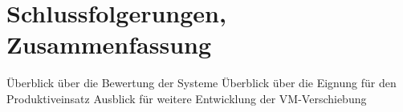 \section{Schlussfolgerungen, Zusammenfassung}
Überblick über die Bewertung der Systeme
Überblick über die Eignung für den Produktiveinsatz
Ausblick für weitere Entwicklung der VM-Verschiebung

